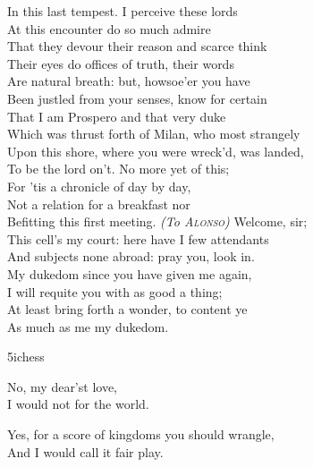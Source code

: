\begin{verse_speech}[Prospero] 
In this last tempest. I perceive these lords\\
At this encounter do so much admire\\
That they devour their reason and scarce think\\
Their eyes do offices of truth, their words\\
Are natural breath: but, howsoe'er you have\\
Been justled from your senses, know for certain\\
That I am Prospero and that very duke\\
Which was thrust forth of Milan, who most strangely\\
Upon this shore, where you were wreck'd, was landed,\\
To be the lord on't. No more yet of this;\\
For 'tis a chronicle of day by day,\\
Not a relation for a breakfast nor\\
Befitting this first meeting. \textit{(To \textsc{Alonso})} Welcome, sir;\\
This cell's my court: here have I few attendants\\
And subjects none abroad: pray you, look in.\\
My dukedom since you have given me again,\\
I will requite you with as good a thing;\\
At least bring forth a wonder, to content ye\\
As much as me my dukedom.
\end{verse_speech}


\begin{bwbigpic}
	[\picwidth]
	{5ichess}
	{}
\end{bwbigpic}




\begin{verse_speech}[Ferdinand] 
No, my dear'st love,\\
I would not for the world.
\end{verse_speech}

\begin{verse_speech}[Miranda] 
Yes, for a score of kingdoms you should wrangle,\\
And I would call it fair play.
\end{verse_speech}

